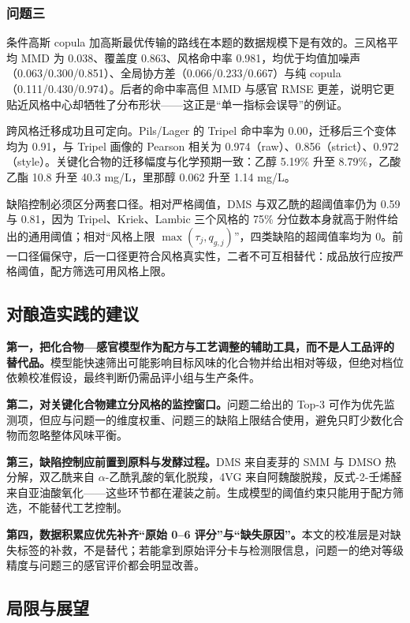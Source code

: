 ﻿\documentclass[UTF8,a4paper,zihao=-4]{ctexart}
\numberwithin{figure}{section}
\numberwithin{table}{section}
\numberwithin{equation}{section}
\begin{document}
\subsubsection{问题三}

条件高斯 copula 加高斯最优传输的路线在本题的数据规模下是有效的。三风格平均 MMD 为 0.038、覆盖度 0.863、风格命中率 0.981，均优于均值加噪声（0.063/0.300/0.851）、全局协方差（0.066/0.233/0.667）与纯 copula（0.111/0.430/0.974）。后者的命中率高但 MMD 与感官 RMSE 更差，说明它更贴近风格中心却牺牲了分布形状——这正是“单一指标会误导”的例证。

跨风格迁移成功且可定向。Pils/Lager 的 Tripel 命中率为 0.00，迁移后三个变体均为 0.91，与 Tripel 画像的 Pearson 相关为 0.974（raw）、0.856（strict）、0.972（style）。关键化合物的迁移幅度与化学预期一致：乙醇 5.19\% 升至 8.79\%，乙酸乙酯 10.8 升至 40.3 mg/L，里那醇 0.062 升至 1.14 mg/L。

缺陷控制必须区分两套口径。相对严格阈值，DMS 与双乙酰的超阈值率仍为 0.59 与 0.81，因为 Tripel、Kriek、Lambic 三个风格的 75\% 分位数本身就高于附件给出的通用阈值；相对“风格上限 $\max(\tau_j,q_{g,j})$”，四类缺陷的超阈值率均为 0。前一口径偏保守，后一口径更符合风格真实性，二者不可互相替代：成品放行应按严格阈值，配方筛选可用风格上限。

\subsection{对酿造实践的建议}

\textbf{第一，把化合物—感官模型作为配方与工艺调整的辅助工具，而不是人工品评的替代品。}模型能快速筛出可能影响目标风味的化合物并给出相对等级，但绝对档位依赖校准假设，最终判断仍需品评小组与生产条件。

\textbf{第二，对关键化合物建立分风格的监控窗口。}问题二给出的 Top-3 可作为优先监测项，但应与问题一的维度权重、问题三的缺陷上限结合使用，避免只盯少数化合物而忽略整体风味平衡。

\textbf{第三，缺陷控制应前置到原料与发酵过程。}DMS 来自麦芽的 SMM 与 DMSO 热分解，双乙酰来自 $\alpha$-乙酰乳酸的氧化脱羧，4VG 来自阿魏酸脱羧，反式-2-壬烯醛来自亚油酸氧化——这些环节都在灌装之前。生成模型的阈值约束只能用于配方筛选，不能替代工艺控制。

\textbf{第四，数据积累应优先补齐“原始 0--6 评分”与“缺失原因”。}本文的校准层是对缺失标签的补救，不是替代；若能拿到原始评分卡与检测限信息，问题一的绝对等级精度与问题三的感官评价都会明显改善。

\subsection{局限与展望}
\end{document}
